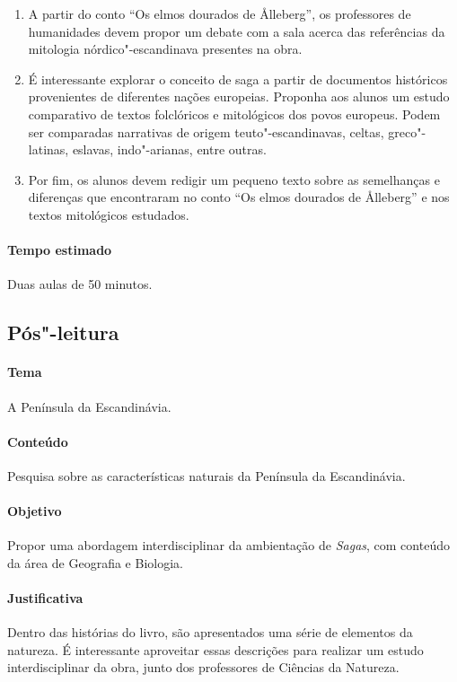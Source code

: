 \documentclass[12pt]{extarticle}
\begin{document}
\begin{enumerate}

\item A partir do conto ``Os elmos dourados de Ålleberg'',
os professores de humanidades devem propor um debate com a sala
acerca das referências da mitologia nórdico"-escandinava presentes
na obra.

\item É interessante explorar o conceito de saga a
partir de documentos históricos provenientes de diferentes nações
europeias. Proponha aos alunos um estudo
comparativo de textos folclóricos e mitológicos dos povos europeus. 
Podem ser comparadas narrativas de origem teuto"-escandinavas,
celtas, greco"-latinas, eslavas, indo"-arianas, entre outras.

\item Por fim, os alunos devem redigir um pequeno texto
sobre as semelhanças e diferenças que encontraram no conto ``Os elmos dourados de Ålleberg''
e nos textos mitológicos estudados.

\end{enumerate}


\paragraph{Tempo estimado} Duas aulas de 50 minutos.

 
\subsection{Pós"-leitura}

\paragraph{Tema} A Península da Escandinávia.

\paragraph{Conteúdo} Pesquisa sobre as características naturais da Península da
Escandinávia.

\paragraph{Objetivo} Propor uma abordagem interdisciplinar da ambientação de \emph{Sagas},
com conteúdo da área de Geografia e Biologia.

\paragraph{Justificativa} Dentro das histórias do livro, são apresentados uma série de elementos da
natureza. É interessante aproveitar essas descrições para realizar um estudo 
interdisciplinar da obra, junto dos professores de Ciências da Natureza. 
\end{document}

